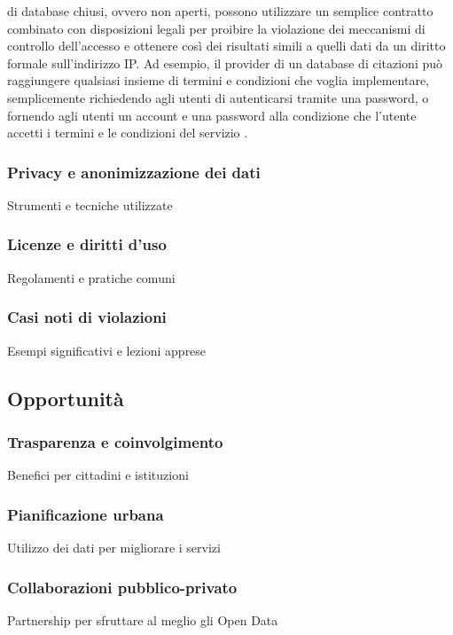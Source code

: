di database chiusi, ovvero non aperti, possono utilizzare un semplice contratto combinato con disposizioni legali per proibire la violazione dei meccanismi di controllo dell'accesso e ottenere così dei risultati simili a quelli dati da un diritto formale sull'indirizzo IP. Ad esempio, il provider di un database di citazioni può raggiungere qualsiasi insieme di termini e condizioni che voglia implementare, semplicemente richiedendo agli utenti di autenticarsi tramite una password, o fornendo agli utenti un account e una password alla condizione che l'utente accetti i termini e le condizioni del servizio \cite{OpenDataHandbook_LegalRights}.


\subsubsection{Privacy e anonimizzazione dei dati}
Strumenti e tecniche utilizzate

\subsubsection{Licenze e diritti d'uso}
Regolamenti e pratiche comuni

\subsubsection{Casi noti di violazioni}
Esempi significativi e lezioni apprese


\subsection{Opportunità}
\subsubsection{Trasparenza e coinvolgimento}
Benefici per cittadini e istituzioni

\subsubsection{Pianificazione urbana}
Utilizzo dei dati per migliorare i servizi

\subsubsection{Collaborazioni pubblico-privato}
Partnership per sfruttare al meglio gli Open Data


